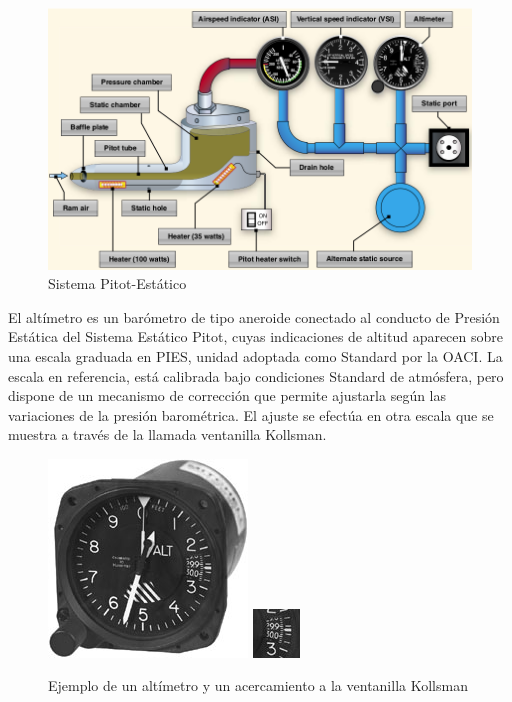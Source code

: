 \documentclass{article}
\begin{document}
\begin{figure}
\begin{center}
\includegraphics[scale=0.45]{figuras/pitostatico.png}
\caption{Sistema Pitot-Estático}
\label{pstati}
\end{center}
\end{figure}


El altímetro es un barómetro de tipo aneroide conectado al conducto de Presión Estática del Sistema Estático Pitot, cuyas indicaciones de altitud aparecen sobre una escala graduada en PIES, unidad adoptada como Standard por la OACI. La escala en referencia, está calibrada bajo condiciones Standard de atmósfera, pero dispone de un mecanismo de corrección que permite ajustarla según las variaciones de la presión barométrica. El ajuste se efectúa en otra escala que se muestra a través de la llamada ventanilla Kollsman.

\begin{figure}
\begin{center}
\includegraphics[scale=0.75]{figuras/altimetro-1.jpg}
\includegraphics[scale = 0.99]{figuras/altimetro-1b.jpg}
\caption{Ejemplo de un altímetro y un acercamiento a la ventanilla Kollsman }
\label{some example}
\end{center}
\end{figure}
\end{document}
